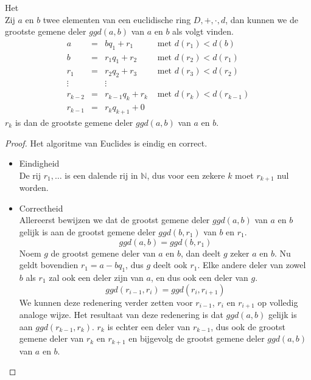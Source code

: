 \documentclass[main.tex]{subfiles}
\begin{document}

\begin{al}
  \label{al:algoritme-van-euclides}
  Het \\
  Zij $a$ en $b$ twee elementen van een euclidische ring $D,+,\cdot,d$, dan kunnen we de grootste gemene deler $ggd(a,b)$ van $a$ en $b$ als volgt vinden.
  \[
  \begin{array}{rcll}
    a &=& bq_{1} + r_{1} &\text{ met } d(r_{1}) < d(b) \\
    b &=& r_{1}q_{1} + r_{2} &\text{ met } d(r_{2}) < d(r_{1}) \\
    r_{1} &=& r_{2}q_{2} + r_{3} &\text{ met } d(r_{3}) < d(r_{2}) \\
    \vdots && \vdots \\
    r_{k-2} &=& r_{k-1}q_{k} + r_{k} &\text{ met } d(r_{k}) < d(r_{k-1}) \\
    r_{k-1} &=& r_{k}q_{k+1} + 0
  \end{array}
  \]
  $r_{k}$ is dan de grootste gemene deler $ggd(a,b)$ van $a$ en $b$.
  \begin{proof}
    Het algoritme van Euclides is eindig en correct.
    \begin{itemize}
    \item Eindigheid\\
      De rij $r_{1},\dotsc$ is een dalende rij in $\mathbb{N}$, dus voor een zekere $k$ moet $r_{k+1}$ nul worden.
    \item Correctheid\\
      Allereerst bewijzen we dat de grootst gemene deler $ggd(a,b)$ van $a$ en $b$ gelijk is aan de grootst gemene deler $ggd(b,r_{1})$ van $b$ en $r_{1}$.
      \[ ggd(a,b) = ggd(b,r_{1}) \]
      Noem $g$ de grootst gemene deler van $a$ en $b$, dan deelt $g$ zeker $a$ en $b$.
      Nu geldt bovendien $r_{1} = a - bq_{1}$, dus $g$ deelt ook $r_{1}$.
      Elke andere deler van zowel $b$ als $r_{1}$ zal ook een deler zijn van $a$, en dus ook een deler van $g$.
      \[ ggd(r_{i-1},r_{i}) = ggd(r_{i},r_{i+1}) \]
      We kunnen deze redenering verder zetten voor $r_{i-1}$, $r_{i}$ en $r_{i+1}$ op volledig analoge wijze.
      Het resultaat van deze redenering is dat $ggd(a,b)$ gelijk is aan $ggd(r_{k-1},r_{k})$.
      $r_{k}$ is echter een deler van $r_{k-1}$, dus ook de grootst gemene deler van $r_{k}$ en $r_{k+1}$ en bijgevolg de grootst gemene deler $ggd(a,b)$ van $a$ en $b$.
    \end{itemize}
  \end{proof}
\end{al}
\end{document}
